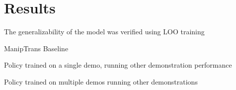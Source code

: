 \section{Results}

The generalizability of the model was verified using LOO training

ManipTrans Baseline

Policy trained on a single demo, running other demonstration performance

Policy trained on multiple demos running other demonstrations
